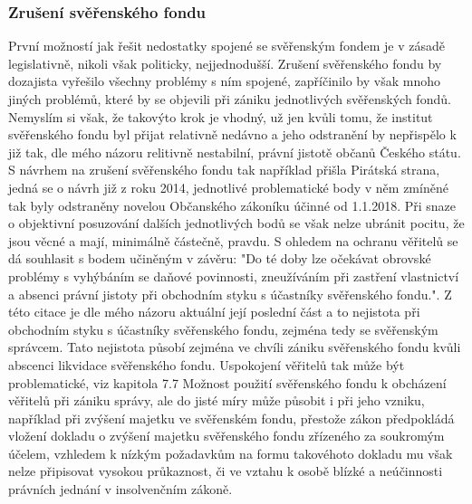\documentclass{article}
\begin{document}
\subsubsection{Zrušení svěřenského fondu}

První možností jak řešit nedostatky spojené se svěřenským fondem je v zásadě legislativně, nikoli však politicky, nejjednodušší. Zrušení svěřenského fondu by dozajista vyřešilo všechny problémy s ním spojené, zapříčinilo by však mnoho jiných problémů, které by se objevili při zániku jednotlivých svěřenských fondů.\\

Nemyslím si však, že takovýto krok je vhodný, už jen kvůli tomu, že institut svěřenského fondu byl přijat relativně nedávno a jeho odstranění by nepřispělo k již tak, dle mého názoru relitivně nestabilní, právní jistotě občanů Českého státu.\\

S návrhem na zrušení svěřenského fondu tak například přišla Pirátská strana, jedná se o návrh již z roku 2014, jednotlivé problematické body v něm zmíněné tak byly odstraněny novelou Občanského zákoníku účinné od 1.1.2018. Při snaze o objektivní posuzování dalších jednotlivých bodů se však nelze ubránit pocitu, že jsou věcné a mají, minimálně částečně, pravdu. S ohledem na ochranu věřitelů se dá souhlasit s bodem učiněným v závěru: "Do té doby lze očekávat obrovské problémy s vyhýbáním se daňové povinnosti, zneužíváním při zastření vlastnictví a absenci právní jistoty při obchodním styku s účastníky svěřenského fondu.". Z této citace je dle mého názoru aktuální její poslední část a to nejistota při obchodním styku s účastníky svěřenského fondu, zejména tedy se svěřenským správcem. Tato nejistota působí zejména ve chvíli zániku svěřenského fondu kvůli abscenci likvidace svěřenského fondu. Uspokojení věřitelů tak může být problematické, viz kapitola 7.7 Možnost použití svěřenského fondu k obcházení věřitelů při zániku správy, ale do jisté míry může působit i při jeho vzniku, například při zvýšení majetku ve svěřenském fondu, přestože zákon předpokládá vložení dokladu o zvýšení majetku svěřenského fondu zřízeného za soukromým účelem, vzhledem k nízkým požadavkům na formu takovéhoto dokladu mu však nelze připisovat vysokou průkaznost, či ve vztahu k osobě blízké a neúčinnosti právních jednání v insolvenčním zákoně.\\ 

\end{document}
